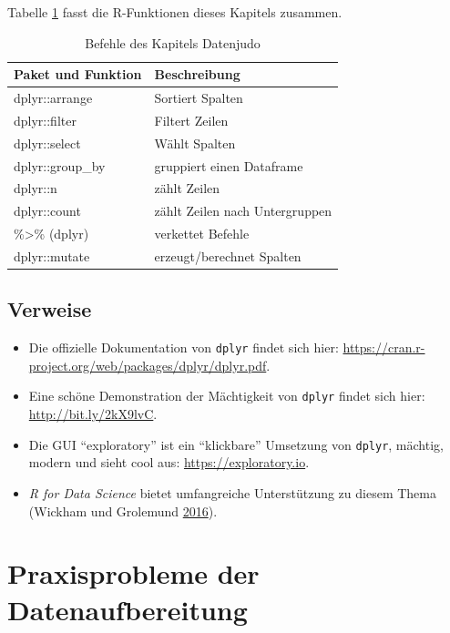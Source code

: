 \documentclass[12pt,ngerman,]{book}
\begin{document}
Tabelle \ref{tab:befehle-datenjudo} fasst die R-Funktionen dieses
Kapitels zusammen.

\begin{table}

\caption{\label{tab:befehle-datenjudo}Befehle des Kapitels Datenjudo}
\centering
\begin{tabular}[t]{l|l}
\hline
Paket und Funktion & Beschreibung\\
\hline
dplyr::arrange & Sortiert Spalten\\
\hline
dplyr::filter & Filtert Zeilen\\
\hline
dplyr::select & Wählt Spalten\\
\hline
dplyr::group\_by & gruppiert einen Dataframe\\
\hline
dplyr::n & zählt Zeilen\\
\hline
dplyr::count & zählt Zeilen nach Untergruppen\\
\hline
\%>\% (dplyr) & verkettet Befehle\\
\hline
dplyr::mutate & erzeugt/berechnet Spalten\\
\hline
\end{tabular}
\end{table}

\section{Verweise}\label{verweise-2}

\begin{itemize}
\item
  Die offizielle Dokumentation von \texttt{dplyr} findet sich hier:
  \url{https://cran.r-project.org/web/packages/dplyr/dplyr.pdf}.
\item
  Eine schöne Demonstration der Mächtigkeit von \texttt{dplyr} findet
  sich hier: \url{http://bit.ly/2kX9lvC}.
\item
  Die GUI ``exploratory'' ist ein ``klickbare'' Umsetzung von
  \texttt{dplyr}, mächtig, modern und sieht cool aus:
  \url{https://exploratory.io}.
\item
  \emph{R for Data Science} bietet umfangreiche Unterstützung zu diesem
  Thema (Wickham und Grolemund \protect\hyperlink{ref-r4ds}{2016}).
\end{itemize}

\chapter{Praxisprobleme der
Datenaufbereitung}\label{praxisprobleme-der-datenaufbereitung}
\end{document}
